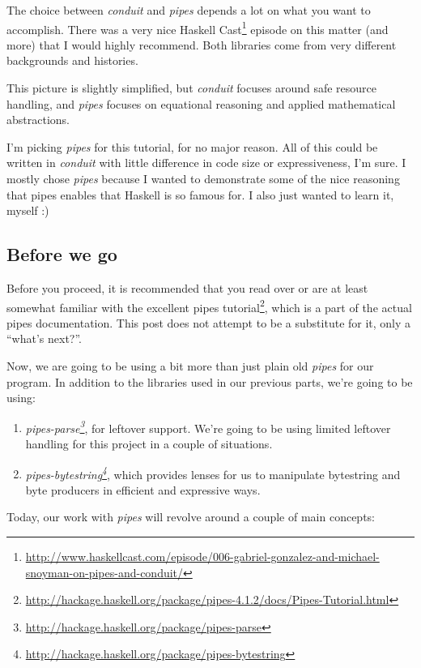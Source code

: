 \documentclass[]{article}
\renewcommand{\href}[2]{#2\footnote{\url{#1}}}
\begin{document}
The choice between \emph{conduit} and \emph{pipes} depends a lot on what you
want to accomplish. There was a very nice
\href{http://www.haskellcast.com/episode/006-gabriel-gonzalez-and-michael-snoyman-on-pipes-and-conduit/}{Haskell
Cast} episode on this matter (and more) that I would highly recommend. Both
libraries come from very different backgrounds and histories.

This picture is slightly simplified, but \emph{conduit} focuses around safe
resource handling, and \emph{pipes} focuses on equational reasoning and applied
mathematical abstractions.

I'm picking \emph{pipes} for this tutorial, for no major reason. All of this
could be written in \emph{conduit} with little difference in code size or
expressiveness, I'm sure. I mostly chose \emph{pipes} because I wanted to
demonstrate some of the nice reasoning that pipes enables that Haskell is so
famous for. I also just wanted to learn it, myself :)

\subsection{Before we go}\label{before-we-go}

Before you proceed, it is recommended that you read over or are at least
somewhat familiar with the excellent
\href{http://hackage.haskell.org/package/pipes-4.1.2/docs/Pipes-Tutorial.html}{pipes
tutorial}, which is a part of the actual pipes documentation. This post does not
attempt to be a substitute for it, only a ``what's next?''.

Now, we are going to be using a bit more than just plain old \emph{pipes} for
our program. In addition to the libraries used in our previous parts, we're
going to be using:

\begin{enumerate}
\def\labelenumi{\arabic{enumi}.}
\tightlist
\item
  \emph{\href{http://hackage.haskell.org/package/pipes-parse}{pipes-parse}}, for
  leftover support. We're going to be using limited leftover handling for this
  project in a couple of situations.
\item
  \emph{\href{http://hackage.haskell.org/package/pipes-bytestring}{pipes-bytestring}},
  which provides lenses for us to manipulate bytestring and byte producers in
  efficient and expressive ways.
\end{enumerate}

Today, our work with \emph{pipes} will revolve around a couple of main concepts:
\end{document}
